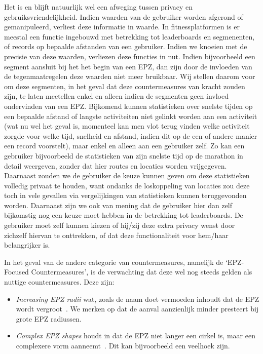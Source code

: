 Het is en blijft natuurlijk wel een afweging tussen privacy en
gebruiksvriendelijkheid. Indien waarden van de gebruiker worden afgerond of
gemanipuleerd, verliest deze informatie in waarde. In fitnessplatformen is er
meestal een functie ingebouwd met betrekking tot leaderboards en segmenenten,
of records op bepaalde afstanden van een gebruiker. Indien we knoeien met de
precisie van deze waarden, verliezen deze functies in nut. Indien bijvoorbeeld
een segment aansluit bij het het begin van een \ac{EPZ}, dan zijn door de
invloeden van de tegenmaatregelen deze waarden niet meer bruikbaar. Wij stellen
daarom voor om deze segmenten, in het geval dat deze countermeasures van kracht
zouden zijn, te laten meetellen enkel en alleen indien de segmenten geen
invloed ondervinden van een \ac{EPZ}. Bijkomend kunnen statistieken over
snelste tijden op een bepaalde afstand of langste activiteiten niet gelinkt
worden aan een activiteit (wat nu wel het geval is, momenteel kan men vlot
terug vinden welke activiteit zorgde voor welke tijd, snelheid en afstand,
indien dit op de een of andere manier een record voorstelt), maar enkel en
alleen aan een gebruiker zelf. Zo kan een gebruiker bijvoorbeeld de
statistieken van zijn snelste tijd op de marathon in detail weergeven, zonder
dat hier routes en locaties worden vrijgegeven. Daarnaast zouden we de
gebruiker de keuze kunnen geven om deze statistieken volledig privaat te
houden, want ondanks de loskoppeling van locaties zou deze toch in vele
gevallen via vergelijkingen van statistieken kunnen teruggevonden worden.
Daarnaast zijn we ook van mening dat de gebruiker hier dan zelf bijkomstig nog
een keuze moet hebben in de betrekking tot leaderboards. De gebruiker moet zelf
kunnen kiezen of hij/zij deze extra privacy wenst door zichzelf hiervan te
onttrekken, of dat deze functionaliteit voor hem/haar belangrijker is.

In het geval van de andere categorie van countermeasures, namelijk de
`EPZ-Focused Countermeasures', is de verwachting dat deze wel nog steeds gelden
als nuttige countermeasures. Deze zijn:
\begin{itemize}
      \item \textit{Increasing \ac{EPZ} radii} wat, zoals de naam doet vermoeden inhoudt dat de \ac{EPZ} wordt vergroot~\cite{Dhondt}. We merken op dat de aanval
            aanzienlijk minder presteert bij grote \ac{EPZ} radiussen.
      \item \textit{Complex \ac{EPZ} shapes} houdt in dat de \ac{EPZ} niet langer een cirkel is, maar een
            complexere vorm aanneemt~\cite{Dhondt}. Dit kan bijvoorbeeld een veelhoek zijn.
\end{itemize}


